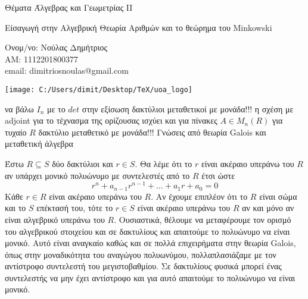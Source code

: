 \documentclass[oneside,a4paper]{article}
\newcommand {\tl}{\textlatin}
\begin{document}
	
	
	\begin{framed}	
		\begin{center}
			\huge Θέματα Άλγεβρας και Γεωμετρίας \tl{II}
		\end{center}
		\begin{center}
			\huge Είσαγωγή στην Αλγεβρική Θεωρία Αριθμών και το θεώρημα του \tl{Minkowski}
		\end{center}
		\vspace{0.3truecm}
		\begin{center}
			Ονομ/νο: Νούλας Δημήτριος\\
			ΑΜ: 1112201800377\\
			\tl{email}: \tl{dimitriosnoulas@gmail.com} \\
			\vspace{0.1cm}
			
		\end{center}
		\vspace{0.3truecm}
	\end{framed}
	\vspace*{\fill}
	\begin{center}
	\texttt{[image: C:/Users/dimit/Desktop/TeX/uoa\_logo]}
	\end{center}
\vspace{1cm}
\pagebreak

να βάλω $I_n$ με το $det$ στην εξίσωση
δακτύλιοι μεταθετικοί με μονάδα!!!
η σχέση με \tl{adjoint} για το τέχνασμα της ορίζουσας ισχύει και για πίνακες $A \in M_n(R)$ για τυχαίο $R$ δακτύλιο μεταθετικό με μονάδα!!!
\noindent Γνώσεις από θεωρία \tl{Galois} και μεταθετική άλγεβρα 



\noindent Έστω $R\subseteq S$ δύο δακτύλιοι και $r \in S$. Θα λέμε ότι το $r$ είναι ακέραιο υπεράνω του $R$ αν υπάρχει μονικό πολυώνυμο με συντελεστές από το $R$ έτσι ώστε $$r^n + a_{n-1}r^{n-1} + \ldots + a_1 r + a_0 = 0$$ Κάθε $r \in R$ είναι ακέραιο υπεράνω του $R$. Aν έχουμε επιπλέον ότι το $R$ είναι σώμα και το $S$ επέκτασή του, τότε το $r \in S$ είναι ακέραιο υπεράνω του $R$ αν και μόνο αν είναι αλγεβρικό υπεράνω του $R$. Ουσιαστικά, θέλουμε να μεταφέρουμε τον ορισμό του αλγεβρικού στοιχείου και σε δακτυλίους και απαιτούμε το πολυώνυμο να είναι μονικό. Αυτό είναι αναγκαίο καθώς και σε πολλά επιχειρήματα στην θεωρία \tl{Galois}, όπως στην μοναδικότητα του αναγώγου πολυωνύμου, πολλαπλασιάζαμε με τον αντίστροφο συντελεστή του μεγιστοβαθμίου. Σε δακτυλίους φυσικά μπορεί ένας συντελεστής να μην έχει αντίστροφο και για αυτό απαιτούμε το πολυώνυμο να είναι μονικό.
\end{document}
